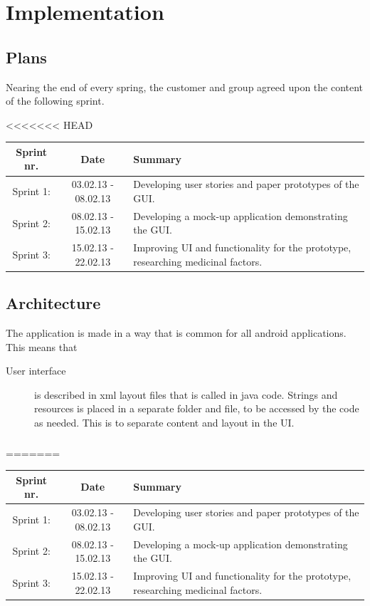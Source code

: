 \chapter{Implementation}
\section{Plans}


Nearing the end of every spring, the customer and group agreed upon the content of the following sprint. 

<<<<<<< HEAD

\begin{tabular}{|c|c|p{6cm}|}
\hline
Sprint nr. & Date & Summary\\
\hline
Sprint 1: & 03.02.13 - 08.02.13 & Developing user stories and paper prototypes of the GUI.\\ 
\hline
Sprint 2: & 08.02.13 - 15.02.13 & Developing a mock-up application demonstrating the GUI.\\
\hline
Sprint 3: & 15.02.13 - 22.02.13 & Improving UI and functionality for the prototype, researching medicinal factors. \\
\hline

\end{tabular} 

 






\section{Architecture}
The application is made in a way that is common for all android applications. This means that
\begin{description}
\item[User interface] is described in xml layout files that is called in java code. Strings and resources is placed in a separate folder and file, to be accessed by the code as needed. This is to separate content and layout in the UI.
\end{description}
\subsection{}
=======

\begin{tabular}{|c|c|p{6cm}|}
\hline
Sprint nr. & Date & Summary\\
\hline
Sprint 1: & 03.02.13 - 08.02.13 & Developing user stories and paper prototypes of the GUI.\\ 
\hline
Sprint 2: & 08.02.13 - 15.02.13 & Developing a mock-up application demonstrating the GUI.\\
\hline
Sprint 3: & 15.02.13 - 22.02.13 & Improving UI and functionality for the prototype, researching medicinal factors. \\
\hline

\end{tabular} 

